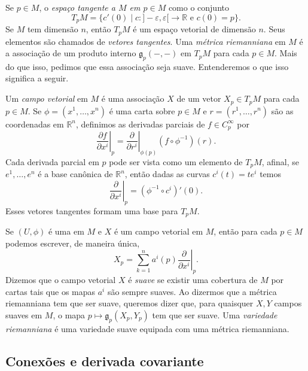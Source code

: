 \documentclass{article}
\begin{document}
Se $p \in M$, o \textit{espaço tangente a $M$ em $p \in M$} como o conjunto \begin{equation}
    T_pM = \{c'(0) \mid c \colon ]-\varepsilon, \varepsilon[ \to \mathbb{R} \text{ e } c(0) = p\}.
\end{equation}
Se $M$ tem dimensão $n$, então $T_pM$ é um espaço vetorial de dimensão $n$. Seus elementos são chamados de \textit{vetores tangentes}. Uma \textit{métrica riemanniana} em $M$ é a associação de um produto interno $\mathfrak{g}_p(-,-)$ em $T_pM$ para cada $p \in M$. Mais do que isso, pedimos que essa associação seja suave. Entenderemos o que isso significa a seguir.

Um \textit{campo vetorial} em $M$ é uma associação $X$ de um vetor $X_p \in T_pM$ para cada $p \in M$. Se $\phi = (x^1, \dots, x^n)$ é uma carta sobre $p \in M$ e $r = (r^1, \dots, r^n)$ são as coordenadas em $\mathbb{R}^n$, definimos as derivadas parciais de $f \in C_p^\infty$ por \begin{equation}
    \left.\frac{\partial f}{\partial x^i}\right|_{p} = \left.\frac{\partial}{\partial r^i}\right|_{\phi(p)} (f \circ \phi^{-1})(r).
\end{equation}
Cada derivada parcial em $p$ pode ser vista como um elemento de $T_pM$, afinal, se $e^1, \dots, e^n$ é a base canônica de $\mathbb{R}^n$, então dadas as curvas $c^i(t) = t e^i$ temos \begin{equation}
    \left.\frac{\partial}{\partial x^i}\right|_p = (\phi^{-1} \circ c^i)'(0).
\end{equation}
Esses vetores tangentes formam uma base para $T_pM$.

Se $(U, \phi)$ é uma em $M$ e $X$ é um campo vetorial em $M$, então para cada $p \in M$ podemos escrever, de maneira única, \begin{equation}
    X_p = \sum_{k = 1}^n a^i(p)\left.\frac{\partial}{\partial x^i}\right|_p.
\end{equation}
Dizemos que o campo vetorial $X$ é \textit{suave} se existir uma cobertura de $M$ por cartas tais que os mapas $a^i$ são sempre suaves. Ao dizermos que a métrica riemanniana tem que ser suave, queremos dizer que, para quaisquer $X, Y$ campos suaves em $M$, o mapa $p \mapsto \mathfrak{g}_p(X_p, Y_p)$ tem que ser suave. Uma \textit{variedade riemanniana} é uma variedade suave equipada com uma métrica riemanniana.

\subsection{Conexões e derivada covariante}
\end{document}
